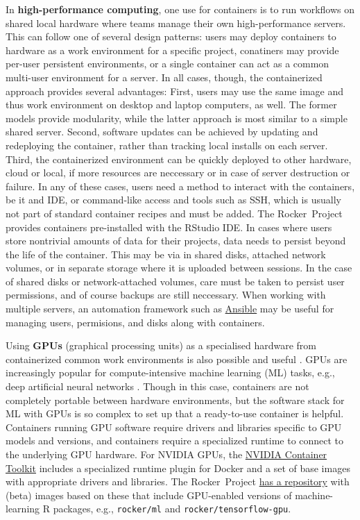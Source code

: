 In \textbf{high-performance computing}, one use for containers is to run
workflows on shared local hardware where teams manage their own
high-performance servers. This can follow one of several design
patterns: users may deploy containers to hardware as a work environment
for a specific project, conatiners may provide per-user persistent
environments, or a single container can act as a common multi-user
environment for a server. In all cases, though, the containerized
approach provides several advantages: First, users may use the same
image and thus work environment on desktop and laptop computers, as
well. The former models provide modularity, while the latter approach is
most similar to a simple shared server. Second, software updates can be
achieved by updating and redeploying the container, rather than tracking
local installs on each server. Third, the containerized environment can
be quickly deployed to other hardware, cloud or local, if more resources
are neccessary or in case of server destruction or failure. In any of
these cases, users need a method to interact with the containers, be it
and IDE, or command-like access and tools such as SSH, which is usually
not part of standard container recipes and must be added. The
Rocker~Project provides containers pre-installed with the RStudio IDE.
In cases where users store nontrivial amounts of data for their
projects, data needs to persist beyond the life of the container. This
may be via in shared disks, attached network volumes, or in separate
storage where it is uploaded between sessions. In the case of shared
disks or network-attached volumes, care must be taken to persist user
permissions, and of course backups are still neccessary. When working
with multiple servers, an automation framework such as
\href{https://www.ansible.com}{Ansible} may be useful for managing
users, permisions, and disks along with containers.

Using \textbf{GPUs} (graphical processing units) as a specialised
hardware from containerized common work environments is also possible
and useful \citep{haydel_enhancing_2015}. GPUs are increasingly popular
for compute-intensive machine learning (ML) tasks, e.g., deep artificial
neural networks \citep{schmidhuber_deep_2015}. Though in this case,
containers are not completely portable between hardware environments,
but the software stack for ML with GPUs is so complex to set up that a
ready-to-use container is helpful. Containers running GPU software
require drivers and libraries specific to GPU models and versions, and
containers require a specialized runtime to connect to the underlying
GPU hardware. For NVIDIA GPUs, the
\href{https://github.com/NVIDIA/nvidia-docker}{NVIDIA Container Toolkit}
includes a specialized runtime plugin for Docker and a set of base
images with appropriate drivers and libraries. The Rocker~Project
\href{https://github.com/rocker-org/ml}{has a repository} with (beta)
images based on these that include GPU-enabled versions of
machine-learning R packages, e.g., \texttt{rocker/ml} and
\texttt{rocker/tensorflow-gpu}.

